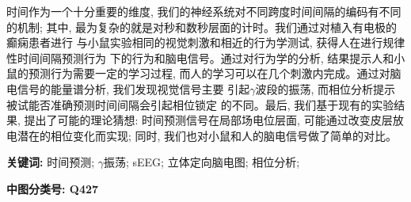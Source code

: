 时间作为一个十分重要的维度, 我们的神经系统对不同跨度时间间隔的编码有不同的机制;
其中, 最为复杂的就是对秒和数秒层面的计时。我们通过对植入有电极的癫痫患者进行
与小鼠实验相同的视觉刺激和相近的行为学测试, 获得人在进行规律性时间间隔预测行为
下的行为和脑电信号。通过对行为学的分析, 结果提示人和小鼠的预测行为需要一定的学习过程,
而人的学习可以在几个刺激内完成。通过对脑电信号的能量谱分析, 我们发现视觉信号主要
引起\(\gamma\)波段的振荡, 而相位分析提示被试能否准确预测时间间隔会引起相位锁定
的不同。最后, 我们基于现有的实验结果, 提出了可能的理论猜想:
时间预测信号在局部场电位层面, 可能通过改变皮层放电潜在的相位变化而实现;
同时, 我们也对小鼠和人的脑电信号做了简单的对比。

\bigskip
\noindent \textbf{关键词: \hspace{\Han}}
时间预测;\;
\(\gamma\)振荡;\;
sEEG;\;
立体定向脑电图;\;
相位分析;\;



\bigskip
\noindent \textbf{中图分类号: \hspace{\Han}Q427}

